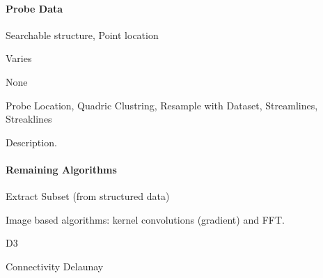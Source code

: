 \documentclass{sig-alternate}
\newcommand{\algorithmclasssection}[1]{\paragraph{#1}}
\newcommand{\algorithmclass}[5]{
  \algorithmclasssection{#1} %
  \begin{description}[leftmargin=4.5em,style=nextline,noitemsep]
  \item[Input] #2
  \item[Output] #3
  \item[Overlap] #4
  \item[Algorithms] #5
  \end{description}
}
\begin{document}
\algorithmclass{Probe Data}
               {Searchable structure, Point location} %
               {Varies} %
               {None} %
               {Probe Location, Quadric Clustring, Resample with Dataset,
                 Streamlines, Streaklines}

\noindent
Description.



\algorithmclasssection{Remaining Algorithms}

Extract Subset (from structured data)

Image based algorithms: kernel convolutions (gradient) and FFT.

D3

Connectivity
Delaunay




\end{document}
